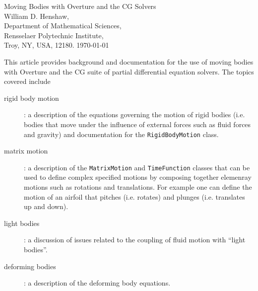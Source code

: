 \documentclass[11pt]{article}
\begin{document}
\baselineskip
\begin{flushleft}
{\Large Moving Bodies with Overture and the CG Solvers} \\
\vspace{2\baselineskip}
William D. Henshaw,\\
Department of Mathematical Sciences, \\
Rensselaer Polytechnic Institute, \\
Troy, NY, USA, 12180.
\vspace{\baselineskip}
\today\\

\vspace{4\baselineskip}

 This article provides background and documentation for
the use of moving bodies with Overture and the CG suite of partial differential
equation solvers. The topics covered include
\begin{description}
  \item[rigid body motion] : a description of the equations governing the motion of rigid bodies (i.e. bodies that move
     under the influence of external forces such as fluid forces and gravity) and documentation
      for the {\tt RigidBodyMotion} class.
  \item[matrix motion] : a description of the {\tt MatrixMotion} and {\tt TimeFunction} classes that can be used to
         define complex specified motions by composing together elemenray motions such as rotations and translations. For example
         one can define the motion of an airfoil that pitches (i.e. rotates) and plunges (i.e. translates
       up and down). 
  \item[light bodies] : a discussion of issues related to the coupling of fluid motion with ``light bodies''. 
  \item[deforming bodies] : a description of the deforming body equations.
\end{description}

\end{flushleft}
\end{document}
